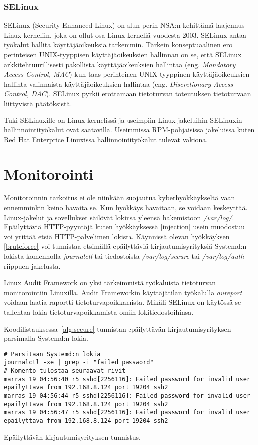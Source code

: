 \subsubsection{SELinux}\label{selinux}
SELinux (Security Enhanced Linux) on alun perin NSA:n kehittämä laajennus Linux-kerneliin, joka on ollut osa Linux-kerneliä vuodesta 2003. SELinux antaa työkalut hallita käyttäjäoikeuksia tarkemmin. Tärkein konseptuaalinen ero perinteisen UNIX-tyyppisen käyttäjäoikeuksien hallinnan on se, että SELinux arkkitehtuurillisesti pakollista käyttäjäoikeuksien hallintaa (eng. \textit{Mandatory Access Control, MAC}) kun taas perinteinen UNIX-tyyppinen käyttäjäoikeuksien hallinta valinnaista käyttäjäoikeuksien hallintaa (eng. \textit{Discretionary Access Control, DAC}). SELinux pyrkii erottamaan tietoturvan toteutuksen tietoturvaan liittyvistä päätöksistä.

Tuki SELinuxille on Linux-kernelissä ja useimpiin Linux-jakeluihin SELinuxin hallinnointityökalut ovat saatavilla. Useimmissa RPM-pohjaisissa jakeluissa kuten Red Hat Enterprice Linuxissa hallinnointityökalut tulevat vakiona.~\cite{selinux}

\section{Monitorointi}\label{monitorointi}
Monitoroinnin tarkoitus ei ole niinkään suojautua kyberhyökkäykseltä vaan ennemminkin keino havaita se. Kun hyökkäys havaitaan, se voidaan keskeyttää. Linux-jakelut ja sovellukset säilövät lokinsa yleensä hakemistoon \textit{/var/log/}. Epäilyttäviä HTTP-pyyntöjä kuten hyökkäyksessä \ref{injection} usein muodostuu voi yrittää etsiä HTTP-palvelimen lokista. Käynnissä olevan hyökkäyksen \ref{bruteforce} voi tunnistaa etsimällä epäilyttäviä kirjautumisyrityksiä Systemd:n lokista komennolla \textit{journalctl} tai tiedostoista \textit{/var/log/secure} tai \textit{/var/log/auth} riippuen jakelusta. 

Linux Audit Framework on yksi tärkeimmistä työkaluista tietoturvan monitorointiin Linuxilla. Audit Frameworkin käyttäjätilan työkalulla \textit{aureport} voidaan laatia raportti tietoturvapoikkamista. Mikäli SELinux on käytössä se tallentaa lokia tietoturvapoikkamista omiin lokitiedostoihinsa.~\cite{xplg}

Koodilistauksessa~\ref{alg:secure} tunnistan epäilyttävän kirjautumisyrityksen parsimalla Systemd:n lokia.

\begin{algorithm}[tbh]
\begin{verbatim}
# Parsitaan Systemd:n lokia
journalctl -xe | grep -i "failed password"
# Komento tulostaa seuraavat rivit
marras 19 04:56:40 r5 sshd[2256116]: Failed password for invalid user
epailyttava from 192.168.8.124 port 19204 ssh2
marras 19 04:56:44 r5 sshd[2256116]: Failed password for invalid user
epailyttava from 192.168.8.124 port 19204 ssh2
marras 19 04:56:47 r5 sshd[2256116]: Failed password for invalid user
epailyttava from 192.168.8.124 port 19204 ssh2
\end{verbatim}
\caption{Epäilyttävän kirjautumisyrityksen tunnistus.\label{alg:secure}}
\end{algorithm}
